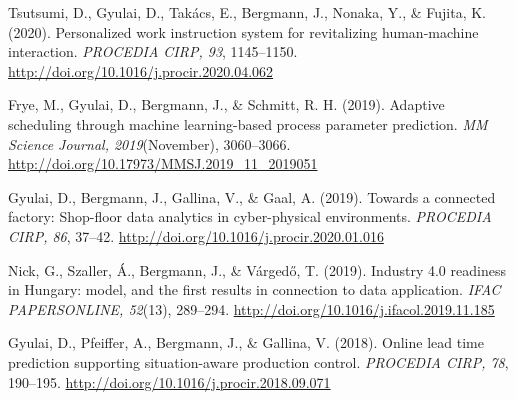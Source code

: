 \documentclass[10pt,a4paper,ragged2e]{altacv}
\begin{document}
\begin{enumerate}[label={[\arabic*]}]
	\item Tsutsumi, D., Gyulai, D., Takács, E., Bergmann, J., Nonaka, Y., \& Fujita, K. (2020). Personalized work instruction system for revitalizing human-machine interaction. \textit{PROCEDIA CIRP, 93}, 1145–1150. \url{http://doi.org/10.1016/j.procir.2020.04.062}
	\item Frye, M., Gyulai, D., Bergmann, J., \& Schmitt, R. H. (2019). Adaptive scheduling through machine learning-based process parameter prediction. \textit{MM Science Journal, 2019}(November), 3060–3066. \url{http://doi.org/10.17973/MMSJ.2019\_11\_2019051}
	\item Gyulai, D., Bergmann, J., Gallina, V., \& Gaal, A. (2019). Towards a connected factory: Shop-floor data analytics in cyber-physical environments. \textit{PROCEDIA CIRP, 86}, 37–42. \url{http://doi.org/10.1016/j.procir.2020.01.016}
	\item Nick, G., Szaller, Á., Bergmann, J., \& Várgedő, T. (2019). Industry 4.0 readiness in Hungary: model, and the first results in connection to data application. \textit{IFAC PAPERSONLINE, 52}(13), 289–294. \url{http://doi.org/10.1016/j.ifacol.2019.11.185}
	\item Gyulai, D., Pfeiffer, A., Bergmann, J., \& Gallina, V. (2018). Online lead time prediction supporting situation-aware production control. \textit{PROCEDIA CIRP, 78}, 190–195. \url{http://doi.org/10.1016/j.procir.2018.09.071}
\end{enumerate}


\nocite{*}






\end{document}
